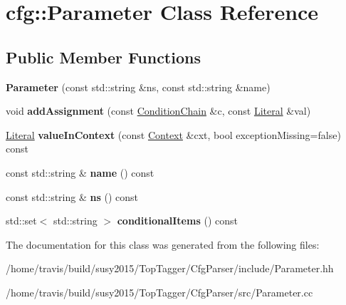 \hypertarget{classcfg_1_1Parameter}{\section{cfg\-:\-:Parameter Class Reference}
\label{classcfg_1_1Parameter}
}
\subsection*{Public Member Functions}
\begin{DoxyCompactItemize}
\item 
\hypertarget{classcfg_1_1Parameter_a208c448cc6de79567c2b2259249c8a79}{{\bfseries Parameter} (const std\-::string \&ns, const std\-::string \&name)}\label{classcfg_1_1Parameter_a208c448cc6de79567c2b2259249c8a79}

\item 
\hypertarget{classcfg_1_1Parameter_accc34a74932a723a9b49d549d9809708}{void {\bfseries add\-Assignment} (const \hyperlink{classcfg_1_1ConditionChain}{Condition\-Chain} \&c, const \hyperlink{classcfg_1_1Literal}{Literal} \&val)}\label{classcfg_1_1Parameter_accc34a74932a723a9b49d549d9809708}

\item 
\hypertarget{classcfg_1_1Parameter_a7d842ced7fa8103fa930eeb69707d1a9}{\hyperlink{classcfg_1_1Literal}{Literal} {\bfseries value\-In\-Context} (const \hyperlink{classcfg_1_1Context}{Context} \&cxt, bool exception\-Missing=false) const }\label{classcfg_1_1Parameter_a7d842ced7fa8103fa930eeb69707d1a9}

\item 
\hypertarget{classcfg_1_1Parameter_a5dbc324f94e7096a3b6cbcaafd3ffd39}{const std\-::string \& {\bfseries name} () const }\label{classcfg_1_1Parameter_a5dbc324f94e7096a3b6cbcaafd3ffd39}

\item 
\hypertarget{classcfg_1_1Parameter_a53bb1d90e0de3cbe2b7385723e8dc097}{const std\-::string \& {\bfseries ns} () const }\label{classcfg_1_1Parameter_a53bb1d90e0de3cbe2b7385723e8dc097}

\item 
\hypertarget{classcfg_1_1Parameter_a29f1055709d780e898fac6c110295ed1}{std\-::set$<$ std\-::string $>$ {\bfseries conditional\-Items} () const }\label{classcfg_1_1Parameter_a29f1055709d780e898fac6c110295ed1}

\end{DoxyCompactItemize}


The documentation for this class was generated from the following files\-:\begin{DoxyCompactItemize}
\item 
/home/travis/build/susy2015/\-Top\-Tagger/\-Cfg\-Parser/include/Parameter.\-hh\item 
/home/travis/build/susy2015/\-Top\-Tagger/\-Cfg\-Parser/src/Parameter.\-cc\end{DoxyCompactItemize}
